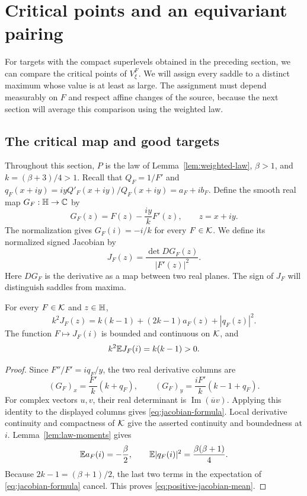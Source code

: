 \section{Critical points and an equivariant pairing}
\label{sec:critical-pairing}

For targets with the compact superlevels obtained in the preceding section,
we can compare the critical points of $V^F_\xi$.  We will assign every saddle to a distinct
maximum whose value is at least as large.  The assignment must depend
measurably on $F$ and respect affine changes of the source, because the next
section will average this comparison using the weighted law.

\subsection{The critical map and good targets}

Throughout this section, $P$ is the law of Lemma~\ref{lem:weighted-law},
$\beta>1$, and $k=(\beta+3)/4>1$.  Recall that
$Q_F=1/F'$ and $q_F(x+iy)=iyQ'_F(x+iy)/Q_F(x+iy)=a_F+ib_F$.
Define the smooth real map $G_F:\mathbb H\to\mathbb C$ by
\begin{equation}
 G_F(z)=F(z)-\frac{iy}{k}F'(z),\qquad z=x+iy.
 \label{eq:critical-map}
\end{equation}
The normalization gives $G_F(i)=-i/k$ for every $F\in\mathcal K$.
We define its normalized signed Jacobian by
\begin{equation}
 J_F(z)=\frac{\det DG_F(z)}{|F'(z)|^2}.
 \label{eq:normalized-jacobian}
\end{equation}
Here $DG_F$ is the derivative as a map between two real planes.  The sign
of $J_F$ will distinguish saddles from maxima.

\begin{lemma}
\label{lem:jacobian-moments}
For every $F\in\mathcal K$ and $z\in\mathbb H$,
\begin{equation}
 k^2J_F(z)=k(k-1)+(2k-1)a_F(z)+|q_F(z)|^2.
 \label{eq:jacobian-formula}
\end{equation}
The function $F\mapsto J_F(i)$ is bounded and continuous on $\mathcal K$, and
\begin{equation}
 k^2\mathbb E J_F(i)=k(k-1)>0.
 \label{eq:positive-jacobian-mean}
\end{equation}
\end{lemma}

\begin{proof}
Since $F''/F'=iq_F/y$, the two real derivative columns are
\[
 (G_F)_x=\frac{F'}{k}(k+q_F),\qquad
 (G_F)_y=\frac{iF'}{k}(k-1+q_F).
\]
For complex vectors $u,v$, their real determinant is
$\operatorname{Im}(\overline u v)$.  Applying this identity to the displayed
columns gives \eqref{eq:jacobian-formula}.  Local derivative continuity and
compactness of $\mathcal K$ give the asserted continuity and boundedness at $i$.
Lemma~\ref{lem:law-moments} gives
\[
 \mathbb E a_F(i)=-\frac\beta2,\qquad
 \mathbb E|q_F(i)|^2=\frac{\beta(\beta+1)}4.
\]
Because $2k-1=(\beta+1)/2$, the last two terms in the expectation of
\eqref{eq:jacobian-formula} cancel.  This proves
\eqref{eq:positive-jacobian-mean}.
\end{proof}

